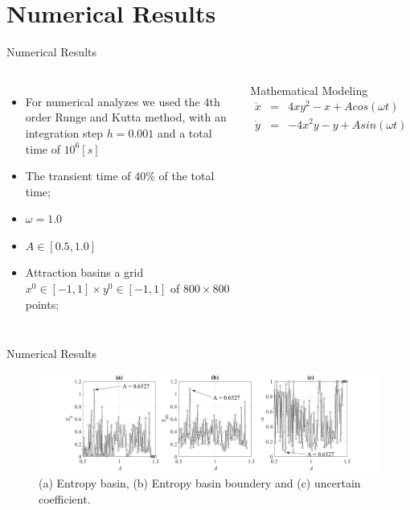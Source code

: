 \documentclass[
	10pt,aspectratio=169 %
]{beamer}
\begin{document}
\section{Numerical Results}
\begin{frame}{Numerical Results}
   \transwipe
   \begin{columns}
   
    \begin{itemize}
        \item For numerical analyzes we used the 4th order Runge and Kutta method, with an integration step $h=0.001$ and a total time of $10^6[s]$
         \item The transient time of $40\%$ of the total time;
         \item $\omega = 1.0$
         \item $A\in [0.5, 1.0]$
         \item Attraction basins a grid $x^{0} \in [-1,1] \times y^0 \in [-1,1]$ of $800\times 800$ points; 
        

    \end{itemize}
    \begin{block}{Mathematical Modeling}
        \begin{eqnarray}
           \dot{x} &=& 4xy^2 -x+ A cos(\omega t) \\ \nonumber
           \dot{y} &=& -4x^2y -y+ A sin(\omega t)
        \end{eqnarray}
        \end{block}
   \end{columns}
   
\end{frame}


\begin{frame}{Numerical Results}
    \begin{figure}
        \centering
        \includegraphics[scale=0.30]{Imagens/entropia_alfa.png}
        \caption{(a) Entropy basin, (b) Entropy basin boundery and (c) uncertain coefficient. }
        \label{fig:fig01}
    \end{figure}
\end{frame}
\end{document}
